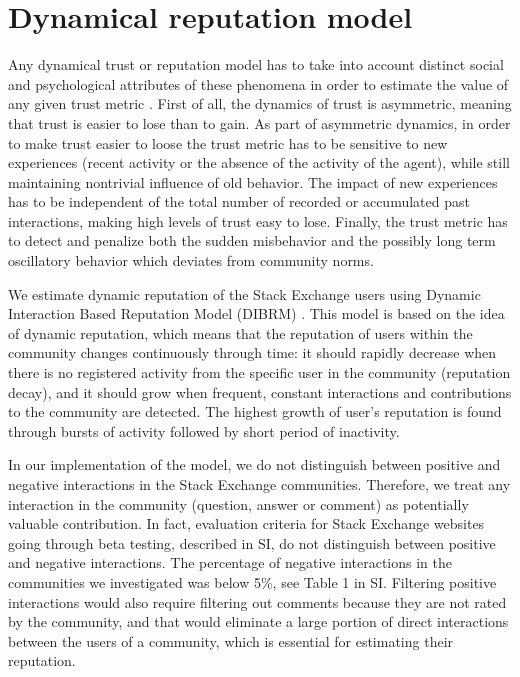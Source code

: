 \section{Dynamical reputation model}

Any dynamical trust or reputation model has to take into account distinct social and psychological attributes of these phenomena in order to estimate the value of any given trust metric \cite{duma2005dynamic}. First of all, the dynamics of trust is asymmetric, meaning that trust is easier to lose than to gain. As part of asymmetric dynamics, in order to make trust easier to loose the trust metric has to be sensitive to new experiences (recent activity or the absence of the activity of the agent), while still maintaining nontrivial influence of old behavior. The impact of new experiences has to be independent of
the total number of recorded or accumulated past interactions, making high levels of trust easy to lose. 
Finally, the trust metric has to detect and penalize both the sudden misbehavior and the possibly long term oscillatory behavior which deviates from community norms.

We estimate dynamic reputation of the Stack Exchange users using Dynamic Interaction Based Reputation Model (DIBRM) \cite{melnikovDynamicInteractionBasedReputation2018}. This model is based on the idea of dynamic reputation, which means that the reputation of users within the community changes continuously through time: it should rapidly decrease when there is no registered activity from the specific user in the community (reputation decay), and it should grow when frequent, constant interactions
and contributions to the community are detected. The highest growth of user's reputation is found through bursts of activity followed by short period of inactivity. 

In our implementation of the model, we do not distinguish between positive and negative interactions in the Stack Exchange communities. Therefore, we treat any interaction in the community (question, answer or comment) as potentially valuable contribution. In fact, evaluation criteria for Stack Exchange websites going through beta testing, described in SI, do not distinguish between positive and negative interactions.
The percentage of negative interactions in the communities we investigated was below 5\%, see Table 1 in SI. Filtering positive interactions would also require filtering out comments because they are not rated by the community, and that would eliminate a large portion of
direct interactions between the users of a community, which is essential for estimating their reputation.

